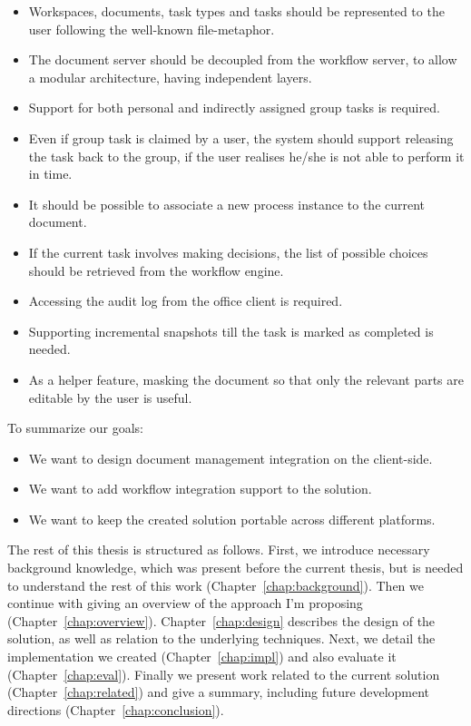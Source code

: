 \begin{itemize}
\item Workspaces, documents, task types and tasks should be represented to the
user following the well-known file-metaphor.
\item The document server should be decoupled from the workflow server, to
allow a modular architecture, having independent layers.
\item Support for both personal and indirectly assigned group tasks is required.
\item Even if group task is claimed by a user, the system should support
releasing the task back to the group, if the user realises he/she is not able to
perform it in time.
\item It should be possible to associate a new process instance to the current
document.
\item If the current task involves making decisions, the list of possible
choices should be retrieved from the workflow engine.
\item Accessing the audit log from the office client is required.
\item Supporting incremental snapshots till the task is marked as completed is
needed.
\item As a helper feature, masking the document so that only the relevant parts
are editable by the user is useful.
\end{itemize}

To summarize our goals:

\begin{itemize}
\item We want to design document management integration on the client-side.
\item We want to add workflow integration support to the solution.
\item We want to keep the created solution portable across different platforms.
\end{itemize}

The rest of this thesis is structured as follows. First, we introduce necessary
background knowledge, which was present before the current thesis, but is
needed to understand the rest of this work (Chapter~\ref{chap:background}). Then we continue with
giving an overview of the approach I'm proposing (Chapter~\ref{chap:overview}). Chapter~\ref{chap:design}
describes the design of the solution, as well as relation to the underlying
techniques. Next, we detail the implementation we created (Chapter~\ref{chap:impl}) and also
evaluate it (Chapter~\ref{chap:eval}). Finally we present work related to the current
solution (Chapter~\ref{chap:related}) and give a summary, including future development
directions (Chapter~\ref{chap:conclusion}).
